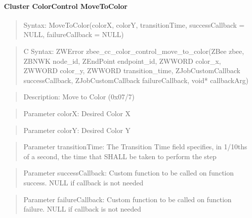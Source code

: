 \paragraph{Cluster ColorControl MoveToColor}
\begin{quote}Syntax: MoveToColor(colorX, colorY, transitionTime, successCallback = NULL, failureCallback = NULL)\end{quote}
\begin{quote}C Syntax: ZWError zbee\_cc\_color\_control\_move\_to\_color(ZBee zbee, ZBNWK node\_id, ZEndPoint endpoint\_id, ZWWORD color\_x, ZWWORD color\_y, ZWWORD transition\_time, ZJobCustomCallback successCallback, ZJobCustomCallback failureCallback, void* callbackArg)\end{quote}
\begin{quote}Description: Move to Color (0x07/7)\end{quote}
\begin{quote}Parameter colorX: Desired Color X\end{quote}
\begin{quote}Parameter colorY: Desired Color Y\end{quote}
\begin{quote}Parameter transitionTime: The Transition Time field specifies, in 1/10ths of a second, the time that SHALL be taken to perform the step\end{quote}
\begin{quote}Parameter successCallback: Custom function to be called on function success. NULL if callback is not needed\end{quote}
\begin{quote}Parameter failureCallback: Custom function to be called on function failure. NULL if callback is not needed\end{quote}


